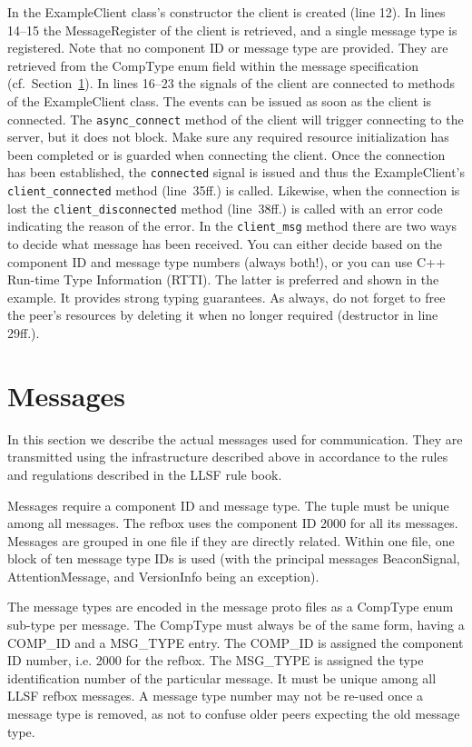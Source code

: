 \documentclass[a4paper]{article}
\newcommand{\refsec}[1]{Section~\ref{#1}}
\begin{document}
In the ExampleClient class's constructor the client is created (line
12). In lines 14--15 the MessageRegister of the client is retrieved,
and a single message type is registered. Note that no component ID or
message type are provided. They are retrieved from the CompType enum
field within the message specification (cf.~\refsec{sec:messages}). In
lines 16--23 the signals of the client are connected to methods of the
ExampleClient class. The events can be issued as soon as the client is
connected. The \texttt{async\_connect} method of the client will
trigger connecting to the server, but it does not block. Make sure any
required resource initialization has been completed or is guarded when
connecting the client. Once the connection has been established, the
\texttt{connected} signal is issued and thus the ExampleClient's
\texttt{client\_connected} method (line~35ff.) is called. Likewise,
when the connection is lost the \texttt{client\_disconnected} method
(line~38ff.) is called with an error code indicating the reason of the
error. In the \texttt{client\_msg} method there are two ways to decide
what message has been received. You can either decide based on the
component ID and message type numbers (always both!), or you can use
C++ Run-time Type Information (RTTI). The latter is preferred and shown
in the example. It provides strong typing guarantees. As always, do
not forget to free the peer's resources by deleting it when no longer
required (destructor in line 29ff.).

\section{Messages}
\label{sec:messages}
In this section we describe the actual messages used for
communication. They are transmitted using the infrastructure described
above in accordance to the rules and regulations described in the LLSF
rule book.

Messages require a component ID and message type. The tuple must be
unique among all messages. The refbox uses the component ID 2000 for
all its messages. Messages are grouped in one file if they are
directly related. Within one file, one block of ten message type IDs
is used (with the principal messages BeaconSignal, AttentionMessage,
and VersionInfo being an exception).

The message types are encoded in the message proto files as a CompType
enum sub-type per message. The CompType must always be of the same
form, having a COMP\_ID and a MSG\_TYPE entry. The COMP\_ID is
assigned the component ID number, i.e. 2000 for the refbox. The
MSG\_TYPE is assigned the type identification number of the particular
message. It must be unique among all LLSF refbox messages. A message
type number may not be re-used once a message type is removed, as not
to confuse older peers expecting the old message type.
\end{document}
